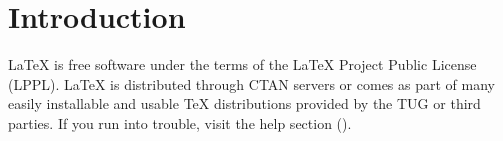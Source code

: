 
\chapter{Introduction}
LaTeX is free software under the terms of the LaTeX Project Public License (LPPL). LaTeX is distributed through CTAN servers or comes as part of many easily installable and usable TeX distributions provided by the \ac{TUG} or third parties. If you run into trouble, visit the help section (\cite{LaTex}).